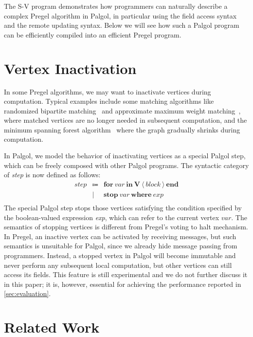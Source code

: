 \documentclass{sokendai_thesis} %
\begin{document}
The S-V program demonstrates how programmers can naturally describe a complex Pregel algorithm in Palgol, in particular using the field access syntax and the remote updating syntax.
Below we will see how such a Palgol program can be efficiently compiled into an efficient Pregel program.

\section{Vertex Inactivation}

In some Pregel algorithms, we may want to inactivate vertices during computation.
Typical examples include some matching algorithms like randomized bipartite matching~\cite{pregel} and approximate maximum weight matching~\cite{optimizing}, where matched vertices are no longer needed in subsequent computation, and the minimum spanning forest algorithm~\cite{optimizing} where the graph gradually shrinks during computation.

In Palgol, we model the behavior of inactivating vertices as a special Palgol step, which can be freely composed with other Palgol programs.
The syntactic category of \textit{step} is now defined as follows:
\[
\begin{array}{lcl}
\mathit{step} & \Coloneqq & \mathbf{for}~\mathit{var}~\mathbf{in}~\mathbf{V}~\langle~\mathit{block}~\rangle~\mathbf{end} \\
 & | & \mathbf{stop}~\mathit{var}~\mathbf{where}~\mathit{exp} \\
\end{array}
\]
The special Palgol step stops those vertices satisfying the condition specified by the boolean-valued expression \textit{exp}, which can refer to the current vertex $\mathit{var}$.
The semantics of stopping vertices is different from Pregel's voting to halt mechanism.
In Pregel, an inactive vertex can be activated by receiving messages, but such semantics is unsuitable for Palgol, since we already hide message passing from programmers.
Instead, a stopped vertex in Palgol will become immutable and never perform any subsequent local computation, but other vertices can still access its fields.
This feature is still experimental and we do not further discuss it in this paper; it is, however, essential for achieving the performance reported in \autoref{sec:evaluation}.

\section{Related Work}
\end{document}
